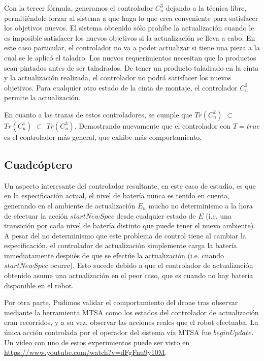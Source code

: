 Con la tercer fórmula, generamos el controlador $C_u^3$ dejando a la técnica libre, permitiéndole forzar al sistema a
que haga lo que crea conveniente para satisfacer los objetivos nuevos. El sistema obtenido sólo prohíbe la actualización
cuando le es imposible satisfacer los nuevos objetivos si la actualización se lleva a cabo. En este caso particular, el
controlador no va a poder actualizar si tiene una pieza a la cual se le aplicó el taladro. Los nuevos requerimientos
necesitan que lo productos sean pintados antes de ser taladrados. De tener un producto taladrado en la cinta y la
actualización realizada, el controlador no podrá satisfacer los nuevos objetivos. Para cualquier otro estado de la cinta
de montaje, el controlador $C_u^3$ permite la actualización.

En cuanto a las trazas de estos controladores, se cumple que $Tr(C_u^2)$ $\subset$ $Tr(C_u^1)$ $\subset$ $Tr(C_u^3)$.
Demostrando nuevamente que el controlador con $T = true$ es el controlador más general, que exhibe más comportamiento.

\subsection{Cuadcóptero}

Un aspecto interesante del controlador resultante, en este caso de estudio, es que en la especificación actual, el nivel
de batería nunca es tenido en cuenta, generando en el ambiente de actualización $E_u$ mucho no determinismo a la hora de
efectuar la acción $startNewSpec$ desde cualquier estado de $E$ (i.e. una transición por cada nivel de batería distinto que
puede tener el nuevo ambiente). A pesar del no determinismo que este problema de control tiene al cambiar la
especificación, el controlador de actualización simplemente carga la batería inmediatamente después de que se efectúe la
actualización (i.e. cuando $startNewSpec$ ocurre). Esto sucede debido a que el controlador de actualización obtenido
asume una actualización en el peor caso, que es cuando no hay batería disponible en el robot.

Por otra parte, Pudimos validar el comportamiento del drone tras observar mediante la herramienta MTSA como los estados
del controlador de actualización eran recorridos, y a su vez, observar las acciones reales que el robot efectuaba. La
única acción controlada por el operador del sistema vía MTSA fue $beginUpdate$. Un video con uno de estos experimientos
puede ser visto en \url{https://www.youtube.com/watch?v=dFgFnu9y10M}.


